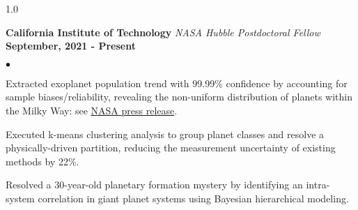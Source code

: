 \documentclass[margin,line, 12pt]{res}
\newenvironment{list2}{
  \begin{list}{$\bullet$}{%
      \setlength{\itemsep}{0.0in}
      \setlength{\parsep}{0in} \setlength{\parskip}{0in}
      \setlength{\topsep}{0.0in} \setlength{\partopsep}{0in}
      \setlength{\leftmargin}{0.2in}}}{\end{list}}
\begin{document}
\begin{spacing}{1.0}
\begin{resume}

\textbf{California Institute of Technology} \hfill \newline
\textit{NASA Hubble Postdoctoral Fellow} \hfill \textbf{September, 2021 - Present}\newline
    \begin{list2}
    	\vspace*{-5mm}
    	\item Extracted exoplanet population trend with 99.99\% confidence by accounting for sample biases/reliability, revealing the non-uniform distribution of planets within the Milky Way: see \href{https://exoplanets.nasa.gov/news/1768/discovery-alert-on-our-galaxys-outskirts-a-poverty-of-planets/}{NASA press release}.
	
	
	\item Executed k-means clustering analysis to group planet classes and resolve a physically-driven partition, reducing the measurement uncertainty of existing methods by 22\%. 
	
	\item Resolved a 30-year-old planetary formation mystery by identifying an intra-system correlation in giant planet systems using Bayesian hierarchical modeling.
	

\end{list2}
\end{resume}
\end{spacing}
\end{document}

